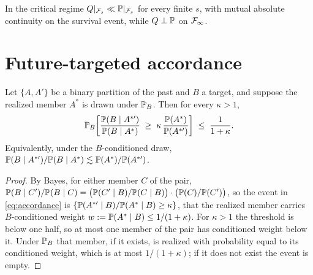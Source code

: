 \begin{theorem}
\label{thm:singular}
In the critical regime $Q|_{\mathcal{F}_s}\ll\mathbb{P}|_{\mathcal{F}_s}$ for every finite $s$,
with mutual absolute continuity on the survival event, while $Q\perp\mathbb{P}$
on $\mathcal{F}_\infty$.
\end{theorem}

\section{Future-targeted accordance}\label{sec:theorem}

\begin{theorem}\label{thm:accordance}
Let $\{A,A'\}$ be a binary partition of the past and $B$ a target, and
suppose the realized member $A^\ast$ is drawn under $\mathbb{P}_B$. Then for every
$\kappa>1$,
\begin{equation}\label{eq:accordance}
\mathbb{P}_B\!\left[\frac{\mathbb{P}(B\mid A^{\ast\prime})}{\mathbb{P}(B\mid A^\ast)}
\;\ge\;\kappa\,\frac{\mathbb{P}(A^\ast)}{\mathbb{P}(A^{\ast\prime})}\right]
\;\le\;\frac{1}{1+\kappa}.
\end{equation}
Equivalently, under the $B$-conditioned draw,
$\mathbb{P}(B\mid A^{\ast\prime})/\mathbb{P}(B\mid A^\ast)\lesssim\mathbb{P}(A^\ast)/\mathbb{P}(A^{\ast\prime})$.
\end{theorem}

\begin{proof}
By Bayes, for either member $C$ of the pair,
$\mathbb{P}(B\mid C')/\mathbb{P}(B\mid C)=\bigl(\mathbb{P}(C'\mid B)/\mathbb{P}(C\mid B)\bigr)\cdot
\bigl(\mathbb{P}(C)/\mathbb{P}(C')\bigr)$, so the event in \eqref{eq:accordance} is
$\{\mathbb{P}(A^{\ast\prime}\mid B)/\mathbb{P}(A^\ast\mid B)\ge\kappa\}$, that the
realized member carries $B$-conditioned weight $w:=\mathbb{P}(A^\ast\mid B)\le
1/(1+\kappa)$. For $\kappa>1$ the threshold is below one half, so at most
one member of the pair has conditioned weight below it. Under $\mathbb{P}_B$ that
member, if it exists, is realized with probability equal to its
conditioned weight, which is at most $1/(1+\kappa)$; if it does not exist
the event is empty.
\end{proof}

